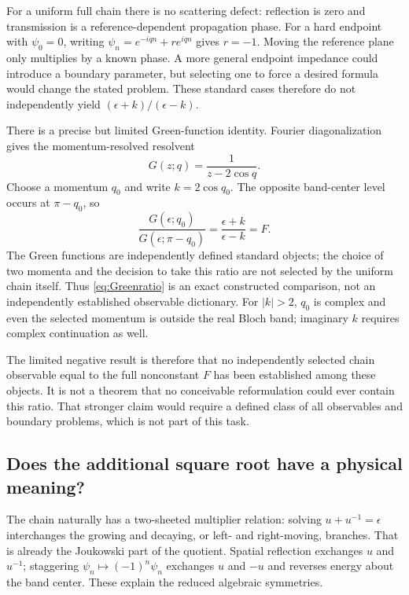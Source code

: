 For a uniform full chain there is no scattering defect: reflection is zero and transmission is a reference-dependent propagation phase. For a hard endpoint with \(\psi_0=0\), writing \(\psi_n=e^{-iqn}+r e^{iqn}\) gives \(r=-1\). Moving the reference plane only multiplies by a known phase. A more general endpoint impedance could introduce a boundary parameter, but selecting one to force a desired formula would change the stated problem. These standard cases therefore do not independently yield \((\epsilon+k)/(\epsilon-k)\).

There is a precise but limited Green-function identity. Fourier diagonalization gives the momentum-resolved resolvent
\[
G(z;q)=\frac1{z-2\cos q}.
\]
Choose a momentum \(q_0\) and write \(k=2\cos q_0\). The opposite band-center level occurs at \(\pi-q_0\), so
\begin{equation}\label{eq:Greenratio}
\frac{G(\epsilon;q_0)}{G(\epsilon;\pi-q_0)}
=\frac{\epsilon+k}{\epsilon-k}=F.
\end{equation}
The Green functions are independently defined standard objects; the choice of two momenta and the decision to take this ratio are not selected by the uniform chain itself. Thus \eqref{eq:Greenratio} is an exact constructed comparison, not an independently established observable dictionary. For \(|k|>2\), \(q_0\) is complex and even the selected momentum is outside the real Bloch band; imaginary \(k\) requires complex continuation as well.

The limited negative result is therefore that no independently selected chain observable equal to the full nonconstant \(F\) has been established among these objects. It is not a theorem that no conceivable reformulation could ever contain this ratio. That stronger claim would require a defined class of all observables and boundary problems, which is not part of this task.

\subsection{Does the additional square root have a physical meaning?}
The chain naturally has a two-sheeted multiplier relation: solving \(u+u^{-1}=\epsilon\) interchanges the growing and decaying, or left- and right-moving, branches. That is already the Joukowski part of the quotient. Spatial reflection exchanges \(u\) and \(u^{-1}\); staggering \(\psi_n\mapsto(-1)^n\psi_n\) exchanges \(u\) and \(-u\) and reverses energy about the band center. These explain the reduced algebraic symmetries.

